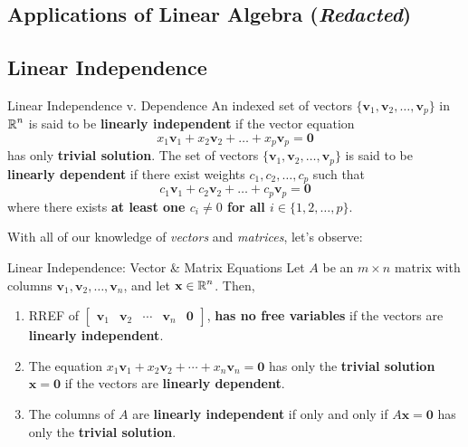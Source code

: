 \documentclass{article}
\begin{document}
\subsection{Applications of Linear Algebra (\emph{Redacted})}

\subsection{Linear Independence}

\begin{definition}{Linear Independence v. Dependence}
	An indexed set of vectors $\{\mathbf{v}_1, \mathbf{v}_2, \ldots, \mathbf{v}_p\}$ in $\operatorname{\mathbb{R}}^n$ is said to be \textbf{linearly independent} if the vector equation
	$$
		x_1\mathbf{v}_1 + x_2\mathbf{v}_2 + \ldots + x_p\mathbf{v}_p = \mathbf{0}
	$$
	has only \textbf{trivial solution}. The set of vectors $\{\mathbf{v}_1, \mathbf{v}_2, \ldots, \mathbf{v}_p\}$ is said to be \textbf{linearly dependent} if there exist weights $c_1, c_2, \ldots, c_p$ such that
	$$
		c_1\mathbf{v}_1 + c_2\mathbf{v}_2 + \ldots + c_p\mathbf{v}_p = \mathbf{0}
	$$
	where there exists \textbf{at least one $c_i \neq 0$ for all $i \in \{1, 2, \ldots, p\}$}.
\end{definition}

With all of our knowledge of \emph{vectors} and \emph{matrices}, let's observe:

\begin{remark}{Linear Independence: Vector \& Matrix Equations}
	Let $A$ be an $m \times n$ matrix with columns $\mathbf{v}_1, \mathbf{v}_2, \ldots, \mathbf{v}_n$, and let $\mathbf{x} \in \operatorname{\mathbb{R}}^n$. Then,
	\begin{enumerate}[label=\alph*),topsep=0pt]
		\item
		      RREF of $\begin{bmatrix} \mathbf{v}_1 & \mathbf{v}_2 & \cdots & \mathbf{v}_n & \mathbf{0} \end{bmatrix}$, \textbf{has no free variables} if the vectors are \textbf{linearly independent}.
		\item
		      The equation $x_1\mathbf{v}_1 + x_2\mathbf{v}_2 + \cdots + x_n\mathbf{v}_n = \mathbf{0}$ has only the \textbf{trivial solution} $\mathbf{x} = \mathbf{0}$ if the vectors are \textbf{linearly dependent}.
		\item
		      The columns of $A$ are \textbf{linearly independent} if only and only if $A\mathbf{x} = \mathbf{0}$ has only the \textbf{trivial solution}.
	\end{enumerate}
\end{remark}
\end{document}
